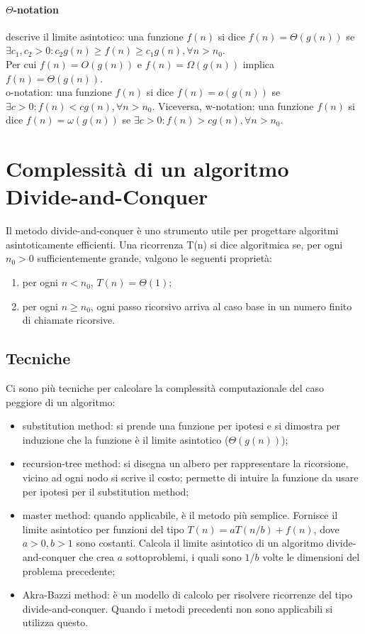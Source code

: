 \documentclass{article}
\begin{document}
\paragraph{$\Theta$-notation} descrive il limite asintotico: una funzione
$f(n)$ si dice $f(n)= \Theta(g(n))$ se $\exists c_1, c_2 > 0:c_2g(n) \geq f(n)
\geq c_1g(n), \forall n>n_0$.\\

Per cui $f(n)=O(g(n))$ e $f(n)=\Omega(g(n))$ implica $f(n)=\Theta(g(n))$.\\
o-notation: una funzione $f(n)$ si dice $f(n)= o(g(n))$ se $\exists c>0: f(n) <
cg(n), \forall n>n_0$. Viceversa, w-notation: una funzione $f(n)$ si dice $f(n)
=\omega(g(n))$ se $\exists c>0: f(n) > cg(n), \forall n>n_0$.

\section{Complessità di un algoritmo Divide-and-Conquer}
Il metodo divide-and-conquer è uno strumento utile per progettare algoritmi
asintoticamente efficienti. Una ricorrenza T(n) si dice algoritmica se, per ogni
$n_0>0$ sufficientemente grande, valgono le seguenti proprietà:
\begin{enumerate}
    \item per ogni $n<n_0$, $T(n)=\Theta(1)$;
    \item per ogni $n\geq n_0$, ogni passo ricorsivo arriva al caso base in un
        numero finito di chiamate ricorsive.
\end{enumerate}

\subsection{Tecniche}
Ci sono più tecniche per calcolare la complessità computazionale del caso
peggiore di un algoritmo:
\begin{itemize}
    \item substitution method: si prende una funzione per ipotesi e si dimostra
        per induzione che la funzione è il limite asintotico ($\Theta(g(n))$);
    \item recursion-tree method: si disegna un albero per rappresentare la
        ricorsione, vicino ad ogni nodo si scrive il costo; permette di intuire
        la funzione da usare per ipotesi per il substitution method;
    \item master method: quando applicabile, è il metodo più semplice. Fornisce
        il limite asintotico per funzioni del tipo $T(n) = aT(n/b) + f(n)$, dove
        $a>0, b>1$ sono costanti. Calcola il limite asintotico di un algoritmo
        divide-and-conquer che crea $a$ sottoproblemi, i quali sono $1/b$ volte
        le dimensioni del problema precedente;
    \item Akra-Bazzi method: è un modello di calcolo per risolvere ricorrenze
        del tipo divide-and-conquer. Quando i metodi precedenti non sono
        applicabili si utilizza questo.
\end{itemize}
\end{document}
